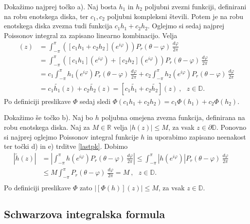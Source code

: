 \documentclass[mat1, tisk]{fmfdelo}
\begin{document}
    \begin{dokaz}
           Dokažimo najprej točko a). Naj bosta $h_1$ in $h_2$ poljubni zvezni funkciji, definirani na robu enotskega diska, ter $c_1, c_2$ poljubni kompleksni števili. 
           Potem je na robu enotskega diska zvezna tudi funkcija $c_1 h_1 + c_2 h_2$. Oglejmo si sedaj najprej Poissonov integral za zapisano linearno kombinacijo. Velja
           \begin{align*}
               [\widetilde{c_1 h_1 + c_2 h_2}](z) &= \int_{-\pi}^{\pi}{\left([c_1 h_1 + c_2 h_2](e^{i\varphi}) \right)P_r(\theta - \varphi)~\frac{d\varphi}{2 \pi}}\\ 
               & = \int_{-\pi}^{\pi}{\left([c_1 h_1](e^{i\varphi}) + [c_2 h_2](e^{i\varphi})\right)P_r(\theta - \varphi)~\frac{d\varphi}{2 \pi}}\\
               & = c_1\int_{-\pi}^{\pi}{h_1(e^{i\varphi})P_r(\theta - \varphi)~\frac{d\varphi}{2 \pi}} + c_2\int_{-\pi}^{\pi}{h_2(e^{i\varphi})P_r(\theta - \varphi)~\frac{d\varphi}{2 \pi}}\\
               & = c_1 \widetilde{h_1}(z) + c_2 \widetilde{h_2}(z) = [c_1 \widetilde{h_1} + c_2 \widetilde{h_2}](z)~,~~~z \in \mathbb{D}.
           \end{align*}
           Po definiciji preslikave $\Phi$ sedaj sledi $\Phi(c_1 h_1 + c_2 h_2) = c_1 \Phi(h_1) + c_2 \Phi(h_2)$.
           
           Dokažimo še točko b). Naj bo $h$ poljubna omejena zvezna funkcija, definirana na robu enotskega diska. Naj za $M \in \mathbb{R}$ velja $|h(z)| \leq M$, za vsak $z \in \partial \mathbb{D}$.
           Ponovno si najprej oglejmo Poissonov integral funkcije $h$ in uporabimo zapisano neenakost ter točki d) in e) trditve \ref{lastpk}. Dobimo
           \begin{align*}
               \left|\widetilde{h}(z)\right| &= \left| \int_{-\pi}^{\pi}{h(e^{i\varphi}) P_r(\theta - \varphi)~\frac{d\varphi}{2 \pi}} \right| \leq \int_{-\pi}^{\pi}{\left|h(e^{i\varphi}) \right|P_r(\theta - \varphi)~\frac{d\varphi}{2 \pi}} \\ 
               &\leq M \int_{-\pi}^{\pi}{P_r(\theta - \varphi)~\frac{d\varphi}{2 \pi}} = M~,~~~z \in \mathbb{D}.& & \\
           \end{align*}
           Po definiciji preslikave $\Phi$ zato $|[\Phi(h)](z)| \leq M$, za vsak $z \in \mathbb{D}$.
    \end{dokaz}

\subsection{Schwarzova integralska formula}
\end{document}

